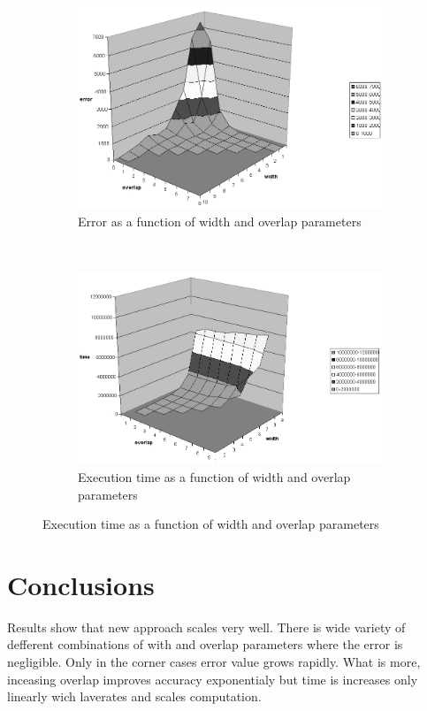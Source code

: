 \documentclass{llncs}
\begin{document}
\begin{figure}
\begin{subfigure}[b]{0.5\textwidth}
\centering
\includegraphics[width=\textwidth]{images/error}
\caption{Error as a function of width and overlap parameters}
\label{fig:error}
\end{subfigure}%
~
\begin{subfigure}[b]{0.5\textwidth}
\centering
\includegraphics[width=\textwidth]{images/czas}
\caption{Execution time as a function of width and overlap parameters}
\label{fig:time}
\end{subfigure}
\end{figure}

\section{Conclusions}

Results show that new approach scales very well.
There is wide variety of defferent combinations of with and overlap parameters where the error is negligible.
Only in the corner cases error value grows rapidly.
What is more, inceasing overlap improves accuracy exponentialy but time is increases only linearly wich laverates and scales computation.
\end{document}
